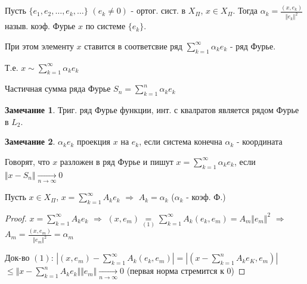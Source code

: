 \documentclass{article}
\theoremstyle{definition}
\numberwithin{theorem}{section}
\numberwithin{lemma}{section}
\numberwithin{definition}{section}
\numberwithin{corollary}{section}
\newtheorem*{remark}{Замечание}
\numberwithin{equation}{section}
\let\implies\Rightarrow
\begin{document}
\begin{definition}
  Пусть $\{e_1,e_2,\dots ,e_k,\dots \}$ $(e_k\neq 0)$ - ортог. сист. в $X_\Pi$,
  $x\in X_\Pi$. Тогда $\alpha_k=\frac{(x,e_k)}{\Vert e_k \Vert^{2}}$ назыв.
  коэф. Фурье $x$ по системе $\{e_k\}$.

  При этом элементу $x$ ставится в соответсвие ряд $\sum_{k=1}^{\infty}\alpha_ke_k$
  - ряд Фурье.

  Т.е. $x \sim \sum_{k=1}^{\infty}\alpha_ke_k$
\end{definition}
\begin{definition}
  Частичная сумма ряда Фурье $S_n=\sum_{k=1}^{n}\alpha_ke_k$
\end{definition}
\begin{remark}
  Триг. ряд Фурье функции, инт. с квалратов является рядом Фурье в $L_2$.
\end{remark}
\begin{remark}
  $\alpha_ke_k$ проекция $x$ на $e_k$, если система конечна $\alpha_k$ - координата
\end{remark}
\begin{definition}
  Говорят, что $x$ разложен в ряд Фурье и пишут $x=\sum_{k=1}^{\infty}\alpha_ke_k$,
  если $\Vert x-S_n \Vert \underset{n\to\infty}{\to} 0$
\end{definition}
\begin{theorem}[Т1]
  Пусть $x \in X_\Pi$, $x=\sum_{k=1}^{\infty}A_ke_k$ $\implies$ $A_k=\alpha_k$ ($\alpha_k$ - коэф. Ф.)
\end{theorem}
\begin{proof}
  $x=\sum_{k=1}^{\infty}A_ke_k$ $\implies$ $(x,e_m)\underset{(1)}{=}\sum_{k=1}^{\infty}A_k(e_k,e_m)=A_m\Vert e_m \Vert^{2}$
  $\implies$ $A_m=\frac{(x,e_m)}{\Vert e_m \Vert^{2}}=\alpha_m$

  Док-во $(1)$: $|(x,e_m) - \sum_{k=1}^{\infty}A_k(e_k,e_m)|=|(x-\sum_{k=1}^{n}A_ke_K,e_m)|$
  $\le \Vert x-\sum_{k=1}^{n}A_ke_k \Vert \Vert e_m \Vert \underset{n\to\infty}{\to}0$
  (первая норма стремится к 0)
\end{proof}

\end{document}
